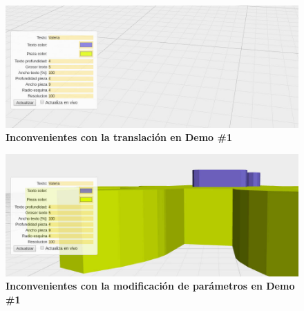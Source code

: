 \begin{figure}[H]
    \includegraphics[width=14cm]{Img/Desarrollo/feedback3.jpg}
    \centering
    \caption{\textbf{ \footnotesize{Inconvenientes con la translación en Demo \#1}}}
     \label{fig:feedback2}
\end{figure}

\begin{figure}[H]
    \includegraphics[width=14cm]{Img/Desarrollo/feedback1.jpg}
    \centering
    \caption{\textbf{ \footnotesize{Inconvenientes con la modificación de parámetros en Demo \#1}}}
     \label{fig:feedback3}
\end{figure}


